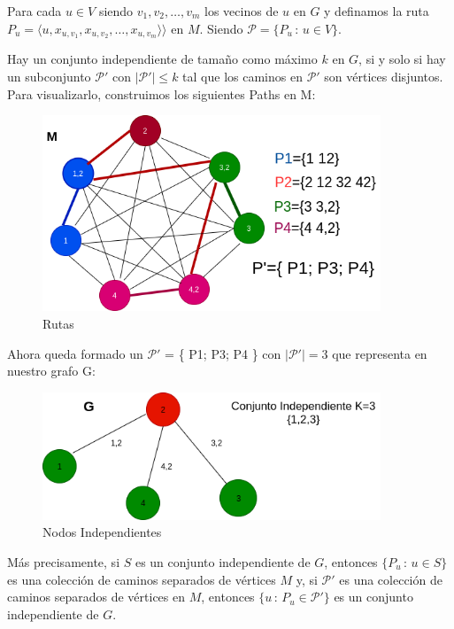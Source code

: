Para cada $u \in V$ siendo $v_1, v_2, \dots, v_m$ los vecinos de $u$ en $G$ y definamos la ruta $P_u = \langle u, x_{u,v_1}, x_{u,v_2}, \dots, x_{u,v_m} \rangle⟩$ en $M$. Siendo $\mathcal{P} = \{P_u \, : \, u \in V\}$.\newline

Hay un conjunto independiente de tamaño como máximo $k$ en $G$, si y solo si hay un subconjunto $\mathcal{P}'$ con $|\mathcal{P}'| \le k$ tal que los caminos en $\mathcal{P}'$ son vértices disjuntos. \newline
Para visualizarlo, construimos los siguientes Paths en M: 

\begin{figure}[H]
\centering
\includegraphics[width=0.9\textwidth]{Informe/Imagenes/Parte1/grafico 3.png}
\caption{\label{fig:class01}Rutas}
\end{figure}

Ahora queda formado un $\mathcal{P}'$ =  \{ P1; P3; P4 \} con $|\mathcal{P}'| = 3$ que representa en nuestro grafo G:

\begin{figure}[H]
\centering
\includegraphics[width=0.9\textwidth]{Informe/Imagenes/Parte1/grafico 4.png}
\caption{\label{fig:class01}Nodos Independientes}
\end{figure}

Más precisamente, si $S$ es un conjunto independiente de $G$, entonces $\{ P_u \, : \, u \in S \}$ es una colección de caminos separados de vértices $M$ y, si $\mathcal{P}'$ es una colección de caminos separados de vértices en $M$, entonces $\{u \, : \, P_u \in \mathcal{P}' \}$ es un conjunto independiente de $G$.

